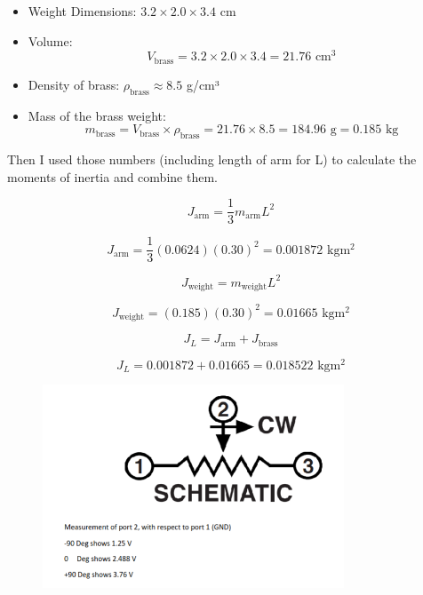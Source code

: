 \documentclass{article}
\begin{document}
\begin{itemize}
    \item Weight Dimensions: \( 3.2 \times 2.0 \times 3.4 \) cm
    \item Volume:
    \begin{equation}
        V_{\text{brass}} = 3.2 \times 2.0 \times 3.4 = 21.76 \text{ cm}^3
    \end{equation}
    \item Density of brass: \( \rho_{\text{brass}} \approx 8.5 \) g/cm³
    \item Mass of the brass weight:
    \begin{equation}
        m_{\text{brass}} = V_{\text{brass}} \times \rho_{\text{brass}} = 21.76 \times 8.5 = 184.96 \text{ g} = 0.185 \text{ kg}
    \end{equation}
\end{itemize}

Then I used those numbers (including length of arm for L) to calculate the moments of inertia and combine them.

\begin{equation}
    J_{\text{arm}} = \frac{1}{3} m_{\text{arm}} L^2
\end{equation}

\begin{equation}
    J_{\text{arm}} = \frac{1}{3} (0.0624) (0.30)^2 = 0.001872 \text{ kg}\text{m}^2
\end{equation}

\begin{equation}
    J_{\text{weight}} = m_{\text{weight}} L^2
\end{equation}

\begin{equation}
    J_{\text{weight}} = (0.185) (0.30)^2 = 0.01665 \text{ kg}\text{m}^2
\end{equation}

\begin{equation}
    J_L = J_{\text{arm}} + J_{\text{brass}}
\end{equation}

\begin{equation}
    J_L = 0.001872 + 0.01665 = 0.018522 \text{ kg}\text{m}^2
\end{equation}

\begin{figure}[H]
    \centering
    \includegraphics[width=0.8\textwidth]{potentiometerSpec.png}
\end{figure}
\end{document}
